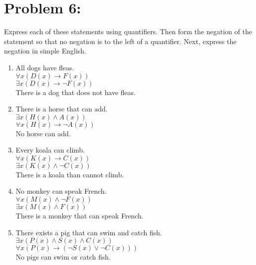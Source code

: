 \documentclass[12pt,en,a4paper]{report}
\begin{document}
	\section*{Problem 6:}
	Express each of these statements using quantifiers. Then form the negation of the statement so that no negation is to the left of a quantifier. Next, express the negation in simple English.
	\begin{enumerate}
		\item All dogs have fleas.\\
		$\forall x (D(x) \rightarrow F(x))$\\
		$\exists x (D(x) \rightarrow \neg F(x))$\\
		There is a dog that does not have fleas.
		\item There is a horse that can add.\\
		$\exists x (H(x) \wedge A(x))$\\
		$\forall x (H(x) \rightarrow \neg A(x))$\\
		No horse can add.
		\item Every koala can climb.\\
		$\forall x (K(x) \rightarrow C(x))$\\
		$\exists x (K(x) \wedge \neg C(x))$\\
		There is a koala than cannot climb.
		\item No monkey can speak French.\\
		$\forall x (M(x) \wedge \neg F(x))$\\
		$\exists x (M(x) \wedge F(x))$\\
		There is a monkey that can speak French.
		\item There exists a pig that can swim and catch fish.\\
		$\exists x (P(x) \wedge S(x) \wedge C(x))$\\
		$\forall x (P(x) \rightarrow (\neg S(x) \vee \neg C(x)))$\\
		No pigs can swim or catch fish.
	\end{enumerate}
\newpage
{}
\end{document}
